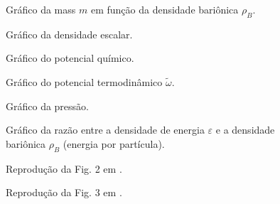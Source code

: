 \begin{figure}
	
	\caption{Gráfico da mass $m$ em função da densidade bariônica $\rho_B$. \protect}
	\label{Fig:mass_NJL-D_1}
\end{figure}


\begin{figure}
	
	\caption{Gráfico da densidade escalar. \protect}
	\label{Fig:scalar_density_NJL-D_1}
\end{figure}

\begin{figure}
	
	\caption{Gráfico do potencial químico. \protect}
	\label{Fig:chemical_potential_NJL-D_1}
\end{figure}

\begin{figure}
	
	\caption{Gráfico do potencial termodinâmico $\tilde{\omega}$. \protect}
	\label{Fig:thermodynamic_potential_NJL-D_1}
\end{figure}

\begin{figure}
	
	\caption{Gráfico da pressão. \protect}
	\label{Fig:pressure_NJL-D_1}
\end{figure}

\begin{figure}
	
	\caption{Gráfico da razão entre a densidade de energia $\varepsilon$ e a densidade bariônica $\rho_B$ (energia por partícula). \protect}
	\label{Fig:energy_density_per_particle_NJL-D_1}
\end{figure}


\begin{figure}
	
	\caption{Reprodução da Fig. 2 em \textcite{japoneses2}. \protect}
	\label{Fig:Mass_Tsue}
\end{figure}

\begin{figure}
	
	\caption{Reprodução da Fig. 3 em \textcite{japoneses2}. \protect}
	\label{Fig:Dens_Tsue}
\end{figure}


